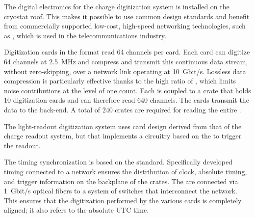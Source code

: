 The digital electronics for the charge digitization system is installed on the cryostat roof. 
This makes it possible to use common design standards and benefit from commercially supported low-cost, high-speed networking technologies, such as , which is used in the telecommunications industry.

Digitization cards in the  format read \num{64} channels per card. Each  card can digitize \num{64} channels at \SI{2.5}{MHz} and compress and transmit this continuous data stream, without zero-skipping, over a network link operating at \SI{10}{Gbit/s}. Lossless data compression is particularly effective thanks to the high  ratio  of , which limits noise contributions at the level of one  count. Each  is coupled to a  crate that holds \num{10}  digitization cards and can therefore read  \num{640} channels. The  cards  transmit the data to the  back-end. A total of \num{240}  crates are required for reading the entire .  

The light-readout digitization system uses   card design derived from that of the charge readout system, but that implements a circuitry based on the   to trigger the readout. 


The timing synchronization is based on the  standard. Specifically developed timing  connected to a  network ensures the distribution of clock, absolute timing, and trigger information on the backplane of the  crates. The  are connected via \SI{1}{Gbit/s} optical fibers to a system of  switches that interconnect the  network. This ensures that the digitization performed by the various  cards is completely aligned; it also refers to the absolute UTC time. 





